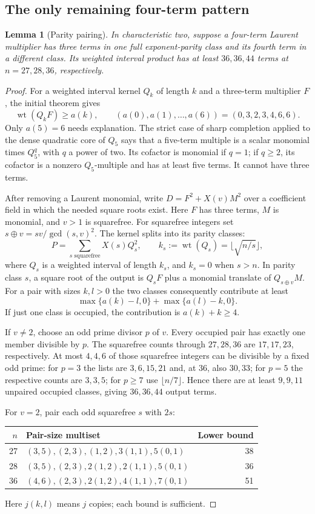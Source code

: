 \documentclass[11pt]{article}
\DeclareMathOperator{\wt}{wt}\DeclareMathOperator{\ord}{ord}
\numberwithin{equation}{section}
\newtheorem{lemma}[theorem]{Lemma}
\theoremstyle{definition}\newtheorem{definition}[theorem]{Definition}
\theoremstyle{remark}\newtheorem{remark}[theorem]{Remark}
\begin{document}
\subsection{The only remaining four-term pattern}

\begin{lemma}[Parity pairing]\label{lem:fin-parity-pair}
In characteristic two, suppose a four-term Laurent multiplier has
three terms in one full exponent-parity class and its fourth term in
a different class.  Its weighted interval product has at least
$36,36,44$ terms at $n=27,28,36$, respectively.
\end{lemma}
\begin{proof}
For a weighted interval kernel $Q_k$ of length $k$ and a three-term
multiplier $F$, the initial theorem gives
\[
 \wt(Q_kF)\ge a(k),\qquad
 (a(0),a(1),\ldots,a(6))=(0,3,2,3,4,6,6).
\]
Only $a(5)=6$ needs explanation.  The strict case of sharp completion
applied to the dense quadratic core of $Q_5$ says that a five-term
multiple is a scalar monomial times $Q_5^q$, with $q$ a power of two.
Its cofactor is monomial if $q=1$; if $q\ge2$, its cofactor is a
nonzero $Q_5$-multiple and has at least five terms.  It cannot have
three terms.

After removing a Laurent monomial, write
$D=F^2+X(v)M^2$ over a coefficient field in which the needed square
roots exist.  Here $F$ has three terms, $M$ is monomial, and $v>1$
is squarefree.  For squarefree integers set
$s\oplus v=sv/\gcd(s,v)^2$.  The kernel splits into its parity classes:
\[
 P=\sum_{s\text{ squarefree}}X(s)Q_s^2,
 \qquad k_s:=\wt(Q_s)=\lfloor\sqrt{n/s}\rfloor,
\]
where $Q_s$ is a weighted interval of length $k_s$, and $k_s=0$
when $s>n$.  In parity class $s$, a square root of the output is
$Q_sF$ plus a monomial translate of $Q_{s\oplus v}M$.
For a pair with sizes $k,l>0$ the two classes consequently contribute
at least
\[
 \max\{a(k)-l,0\}+\max\{a(l)-k,0\}.
\]
If just one class is occupied, the contribution is $a(k)+k\ge4$.

If $v\ne2$, choose an odd prime divisor $p$ of $v$.  Every occupied
pair has exactly one member divisible by $p$.  The squarefree counts
through $27,28,36$ are $17,17,23$, respectively.  At most $4,4,6$
of those squarefree integers can be divisible by a fixed odd prime:
for $p=3$ the lists are $3,6,15,21$ and, at $36$, also $30,33$;
for $p=5$ the respective counts are $3,3,5$; for $p\ge7$ use
$\lfloor n/7\rfloor$.  Hence there are at least $9,9,11$ unpaired
occupied classes, giving $36,36,44$ output terms.

For $v=2$, pair each odd squarefree $s$ with $2s$:
\begin{center}
\begin{tabular}{r|l|r}
$n$&Pair-size multiset&Lower bound\\\hline
27&$(3,5),(2,3),(1,2),3(1,1),5(0,1)$&38\\
28&$(3,5),(2,3),2(1,2),2(1,1),5(0,1)$&36\\
36&$(4,6),(2,3),2(1,2),4(1,1),7(0,1)$&51
\end{tabular}
\end{center}
Here $j(k,l)$ means $j$ copies; each bound is sufficient.
\end{proof}
\end{document}
